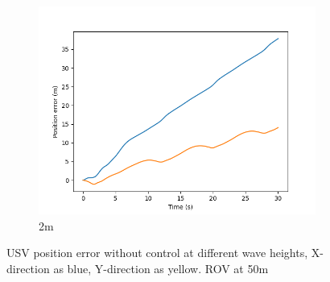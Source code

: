 \documentclass[class=article, crop=false]{standalone}
\begin{document}
\begin{figure}
\begin{subfigure}[b]{0.48\textwidth}
        \includegraphics{scenario1/rov-50m/2.0m/usv_pos_error_uncontrolled}
        \caption{2m}
        \label{}
    \end{subfigure}
    \caption{USV position error without control at different wave heights, X-direction as blue, Y-direction as yellow. ROV at 50m}
    \label{}
\end{figure}
\end{document}
